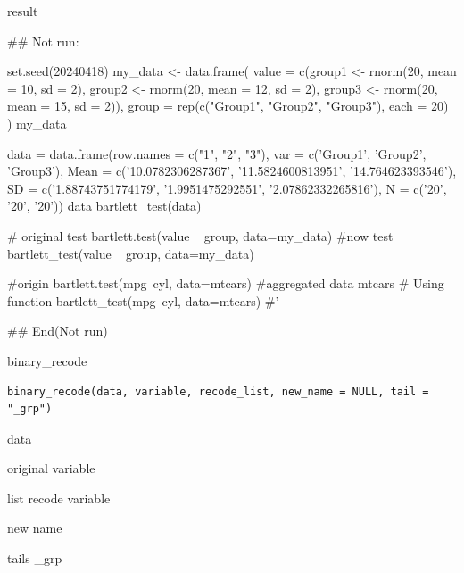 \documentclass[a4paper]{book}
\begin{document}
%
\begin{Value}
result
\end{Value}
%
\begin{Examples}
\begin{ExampleCode}

## Not run: 

set.seed(20240418)
my_data <- data.frame(
  value = c(group1 <- rnorm(20, mean = 10, sd = 2),
            group2 <- rnorm(20, mean = 12, sd = 2),
            group3 <- rnorm(20, mean = 15, sd = 2)),
  group = rep(c("Group1", "Group2", "Group3"), each = 20)
)
my_data %

data = data.frame(row.names = c("1", "2", "3"),
                  var = c('Group1', 'Group2', 'Group3'),
                  Mean = c('10.0782306287367', '11.5824600813951', '14.764623393546'),
                  SD = c('1.88743751774179', '1.9951475292551', '2.07862332265816'),
                  N = c('20', '20', '20'))
data
bartlett_test(data)

# original test
bartlett.test(value ~ group, data=my_data)
#now test
bartlett_test(value ~ group, data=my_data)


#origin
bartlett.test(mpg~cyl, data=mtcars)
#aggregated data
mtcars%
# Using function
bartlett_test(mpg~cyl, data=mtcars)
#'

## End(Not run)
\end{ExampleCode}
\end{Examples}
%
\begin{Description}
binary\_recode
\end{Description}
%
\begin{Usage}
\begin{verbatim}
binary_recode(data, variable, recode_list, new_name = NULL, tail = "_grp")
\end{verbatim}
\end{Usage}
%
\begin{Arguments}
\begin{ldescription}
\item[\code{data}] data

\item[\code{variable}] original variable

\item[\code{recode\_list}] list recode variable

\item[\code{new\_name}] new name

\item[\code{tail}] tails \_grp
\end{ldescription}
\end{Arguments}
\end{document}
